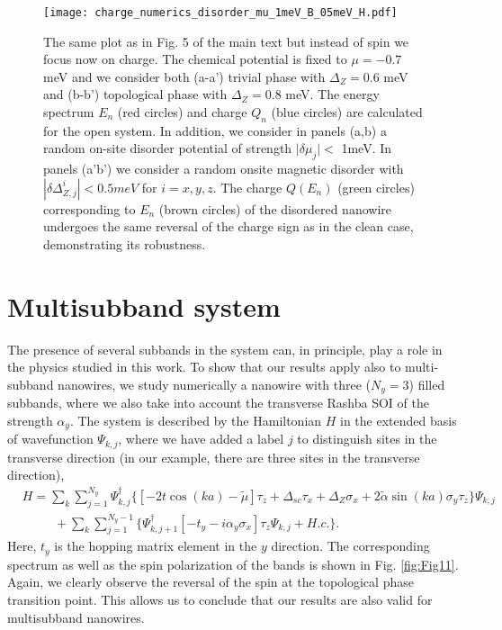 \documentclass[prl,twocolumn,showpacs,floatfix,amsbsy,amsbsy,superscriptaddress]{revtex4-1}
\begin{document}
\begin{figure}[ht]
\centering
\texttt{[image: charge\_numerics\_disorder\_mu\_1meV\_B\_05meV\_H.pdf]}
\caption{ The same plot as in Fig. 5 of the main text but instead of spin we focus now on charge.  The chemical potential is fixed to $\mu=-0.7$ meV and we consider both (a-a') trivial phase with $\Delta_Z= 0.6$ meV and (b-b') topological phase with  $\Delta_Z=0.8$ meV. The energy spectrum $E_n$ (red circles) and charge $Q_n$ (blue circles) are calculated  for the open system.
In addition, we consider in panels (a,b) a random on-site disorder potential of strength $|\delta\mu_j\vert <$ 1meV. In panels (a'b') we consider a random onsite magnetic disorder with $|\delta\Delta^{i}_{Z,j}|<0.5meV$ for $i=x, y, z$.
The charge $Q(E_n)$ (green circles) corresponding to $E_n$ (brown circles) of the disordered nanowire undergoes the same reversal of the charge sign as in the clean case, demonstrating its robustness.}
  \label{fig:Fig13}
\end{figure}



\section{Multisubband system}

The presence of several subbands in the system can, in principle, play a role in the physics studied in this work. To show that our results apply also to multi-subband nanowires, we study numerically a nanowire with three ($N_y=3$) filled subbands, where we also take into account the transverse Rashba SOI of the strength $\alpha_y$. The system is described by the Hamiltonian $H$ in the extended basis of wavefunction $\Psi_{k,j}$, where we have added a label $j$ to distinguish sites in the transverse direction (in our example, there are three sites in the transverse direction),
\begin{align} 
&H=\sum_{k} \sum_{j=1}^{N_y} \Psi_{k,j}^\dag \Big\{ [-2t\cos(ka)-\tilde{\mu}]\tau_z +\Delta_{sc}\tau_x+\Delta_{Z}\sigma_x+2\tilde{\alpha}\sin(ka)\sigma_y\tau_z\Big\}\Psi_{k,j} \nonumber\\
&\hspace{30pt}+\sum_{k} \sum_{j=1}^{N_y-1}\Big\{\Psi_{k,j+1}^\dag[-t_y-i\alpha_y\sigma_x]\tau_z\Psi_{k,j}+H.c.\Big\}.
\end{align}
Here, $t_y$ is the hopping matrix element in the $y$ direction. The corresponding spectrum as well as the spin polarization of the bands is shown in Fig. \ref{fig:Fig11}. Again, we clearly observe the reversal of the spin at the topological  phase transition point. This allows us to conclude that our results are also valid for multisubband nanowires.
\end{document}
